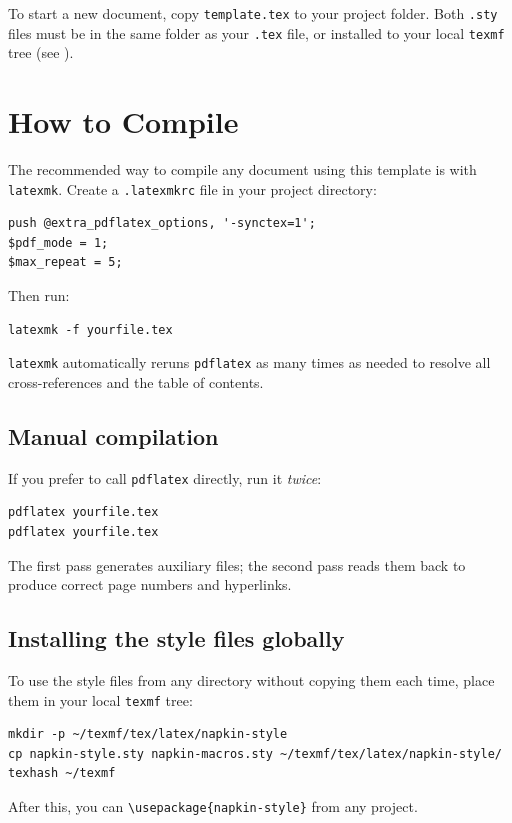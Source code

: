 \documentclass[11pt]{scrartcl}
\begin{document}
To start a new document, copy \texttt{template.tex} to your project folder.
Both \texttt{.sty} files must be in the same folder as your \texttt{.tex} file,
or installed to your local \texttt{texmf} tree (see ).

\section{How to Compile}
\label{sec:compile}

The recommended way to compile any document using this template is with
\texttt{latexmk}. Create a \texttt{.latexmkrc} file in your project directory:

\begin{verbatim}
push @extra_pdflatex_options, '-synctex=1';
$pdf_mode = 1;
$max_repeat = 5;
\end{verbatim}

Then run:
\begin{verbatim}
latexmk -f yourfile.tex
\end{verbatim}

\texttt{latexmk} automatically reruns \texttt{pdflatex} as many times as
needed to resolve all cross-references and the table of contents.

\subsection{Manual compilation}

If you prefer to call \texttt{pdflatex} directly, run it \emph{twice}:
\begin{verbatim}
pdflatex yourfile.tex
pdflatex yourfile.tex
\end{verbatim}
The first pass generates auxiliary files; the second pass reads them back
to produce correct page numbers and hyperlinks.

\subsection{Installing the style files globally}
\label{sec:install}

To use the style files from any directory without copying them each time,
place them in your local \texttt{texmf} tree:
\begin{verbatim}
mkdir -p ~/texmf/tex/latex/napkin-style
cp napkin-style.sty napkin-macros.sty ~/texmf/tex/latex/napkin-style/
texhash ~/texmf
\end{verbatim}
After this, you can \verb|\usepackage{napkin-style}| from any project.
\end{document}
